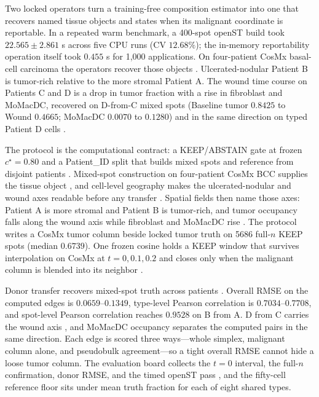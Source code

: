 Two locked operators turn a training-free composition estimator into one that recovers named tissue objects and states when its malignant coordinate is reportable. In a repeated warm benchmark, a 400-spot openST build took \(22.565\pm2.861\) s across five CPU runs (CV \(12.68\%\)); the in-memory reportability operation itself took \(0.455\) s for 1,000 applications. On four-patient CosMx basal-cell carcinoma the operators recover those objects \citep{Andreatta2024zenodo,Yerly2022,Yerly2025preprint}. Ulcerated-nodular Patient B is tumor-rich relative to the more stromal Patient A. The wound time course on Patients C and D is a drop in tumor fraction with a rise in fibroblast and MoMacDC, recovered on D-from-C mixed spots (Baseline tumor \(0.8425\) to Wound \(0.4665\); MoMacDC \(0.0070\) to \(0.1280\)) and in the same direction on typed Patient D cells \citep{Yerly2025preprint,Dvorak1986}.

The protocol is the computational contract: a KEEP/ABSTAIN gate at frozen \(c^\star=0.80\) and a Patient\_ID split that builds mixed spots and reference from disjoint patients \citep{Kiselev2018,deKanter2019,Cable2022}. Mixed-spot construction on four-patient CosMx BCC supplies the tissue object \citep{Stahl2016,Miller2022}, and cell-level geography makes the ulcerated-nodular and wound axes readable before any transfer \citep{Yerly2022,Yerly2025preprint}. Spatial fields then name those axes: Patient A is more stromal and Patient B is tumor-rich, and tumor occupancy falls along the wound axis while fibroblast and MoMacDC rise \citep{Dvorak1986,Yerly2025preprint}. The protocol writes a CosMx tumor column beside locked tumor truth on 5686 full-\(n\) KEEP spots (median \(0.6739\)). One frozen cosine holds a KEEP window that survives interpolation on CosMx at \(t=0,0.1,0.2\) and closes only when the malignant column is blended into its neighbor \citep{He2022,Kiselev2018}.

Donor transfer recovers mixed-spot truth across patients \citep{Cable2022,Kleshchevnikov2022}. Overall RMSE on the computed edges is \(0.0659\)--\(0.1349\), type-level Pearson correlation is \(0.7034\)--\(0.7708\), and spot-level Pearson correlation reaches \(0.9528\) on B from A. D from C carries the wound axis \citep{Yerly2025preprint}, and MoMacDC occupancy separates the computed pairs in the same direction. Each edge is scored three ways---whole simplex, malignant column alone, and pseudobulk agreement---so a tight overall RMSE cannot hide a loose tumor column. The evaluation board collects the \(t=0\) interval, the full-\(n\) confirmation, donor RMSE, and the timed openST pass \citep{Schott2024}, and the fifty-cell reference floor sits under mean truth fraction for each of eight shared types.

